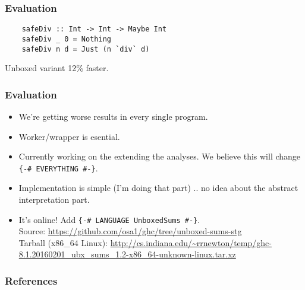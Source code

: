\documentclass{beamer}
\begin{document}
\begin{frame}[fragile]
    \frametitle{Evaluation}

    \begin{verbatim}
    safeDiv :: Int -> Int -> Maybe Int
    safeDiv _ 0 = Nothing
    safeDiv n d = Just (n `div` d)
    \end{verbatim}

    Unboxed variant 12\% faster.

\end{frame}

\begin{frame}
    \frametitle{Evaluation}

    \begin{itemize}
    \item
        We're getting worse results in every single program.

    \item
        Worker/wrapper is esential.

    \item
        Currently working on the extending the analyses. We believe this will
        change \texttt{\{-\# EVERYTHING \#-\}}.

    \item
        Implementation is simple (I'm doing that part) .. no idea about the
        abstract interpretation part.

    \item
        It's online! Add \texttt{\{-\# LANGUAGE UnboxedSums \#-\}}.\\
        Source: \url{https://github.com/osa1/ghc/tree/unboxed-sums-stg} \\
        Tarball (x86\_64 Linux): \url{http://cs.indiana.edu/~rrnewton/temp/ghc-8.1.20160201\_ubx\_sums\_1.2-x86\_64-unknown-linux.tar.xz}
    \end{itemize}
\end{frame}

\begin{frame}[allowframebreaks]
    \frametitle{References}

    
    
\end{frame}
\end{document}
